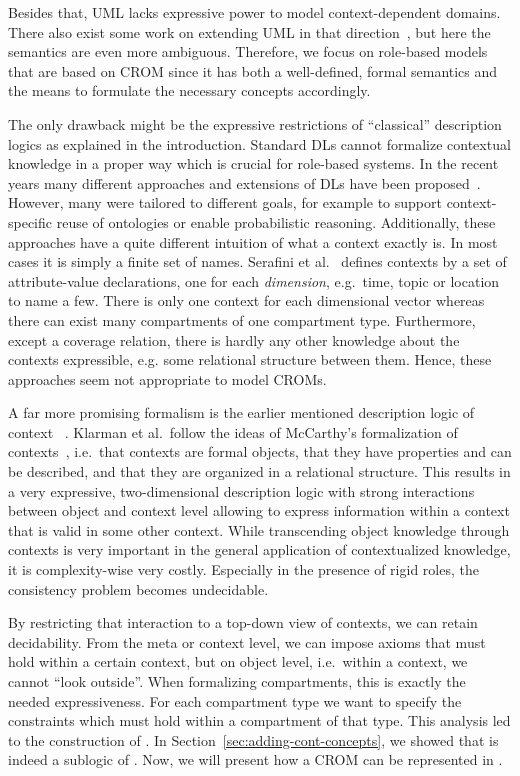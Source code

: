 Besides that, UML lacks expressive power to model context-dependent domains. There also exist some
work on extending UML in that direction~\cite{ShB-ICMB05}, but here the semantics are even more ambiguous.
Therefore, we focus on role-based models that are based on CROM since it has both a well-defined,
formal semantics and the means to formulate the necessary concepts accordingly.

The only drawback might be the expressive restrictions of ``classical'' description logics as
explained in the introduction. Standard DLs cannot formalize contextual knowledge in a proper way
which is crucial for role-based systems.  In the recent years many different approaches and
extensions of DLs have been proposed~\cite{BoGH-ISWC03, BoGH-WS04, BeAF-ADVIS06, BaVS-ModOnt09, BaKP-JWS12,
  CePe-IJCAR14, CePe-JAR17}.  However, many were tailored to different goals, for example to support
context-specific reuse of ontologies or enable probabilistic reasoning. Additionally, these
approaches have a quite different intuition of what a context exactly is. In most cases it is simply
a finite set of names.  Serafini et al.~\cite{SeHo-JWS12} defines contexts by a set of
attribute-value declarations, one for each \emph{dimension}, e.g.\ time, topic or location to name a
few. There is only one context for each dimensional vector whereas there can exist many compartments
of one compartment type.  Furthermore, except a coverage relation, there is hardly any other
knowledge about the contexts expressible, e.g. some relational structure between them.  Hence, these
approaches seem not appropriate to model CROMs.

A far more promising formalism is the earlier mentioned description logic of context
\klarALC~\cite{KG-JELIA10, KG16}. Klarman et al.\ follow the ideas of McCarthy's formalization of
contexts~\cite{McC-ACM87,McC-IJCAI93}, i.e.\ that contexts are formal objects, that they have
properties and can be described, and that they are organized in a relational structure.  This
results in a very expressive, two-dimensional description logic with strong interactions between
object and context level allowing to express information within a context that is valid in some
other context.  While transcending object knowledge through contexts is very important in
the general application of contextualized knowledge, it is complexity-wise very costly. Especially
in the presence of rigid roles, the consistency problem becomes undecidable.

By restricting that interaction to a top-down view of contexts, we can retain decidability. From the
meta or context level, we can impose axioms that must hold within a certain context, but on object
level, i.e.\ within a context, we cannot ``look outside''.
%
When formalizing compartments, this is exactly the needed expressiveness. For each compartment type
we want to specify the constraints which must hold within a compartment of that type.
%
This analysis led to the construction of \LMLO.
In Section~\ref{sec:adding-cont-concepts}, we showed that \ALCALC is indeed a sublogic of \klarALC.
Now, we will present how a CROM can be represented in \LMLO.


